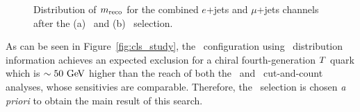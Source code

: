 \begin{figure}[htb]\begin{center}
	\caption[bla]{Distribution of $m_{\rm reco}$  for the combined $e$+jets and $\mu$+jets channels after the (a) \loose\ and (b) \tight\ selection.
        \label{fig:mrecoBIS}}
\end{center}\end{figure}




As can be seen in Figure~\ref{fig:cls_study}, the \tight\ configuration using 
\mreco\ distribution information achieves an expected
exclusion for a chiral fourth-generation $\T$ quark which is $\sim 50\gev$ 
higher than the reach of both the
\loose\ and \tight\ cut-and-count analyses, whose sensitivies are comparable.
Therefore, the \tight\ selection is chosen 
{\it a priori} to obtain the main result of this search.

